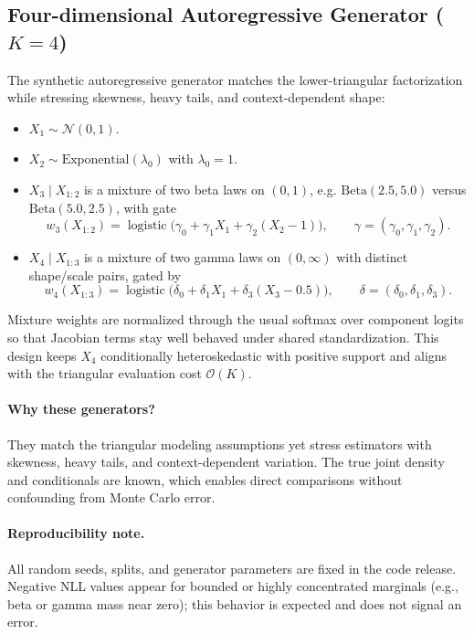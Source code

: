 \documentclass[11pt,a4paper,twoside]{book}\usepackage[]{graphicx}\usepackage[]{xcolor}
\begin{document}
\subsection{Four-dimensional Autoregressive Generator ($K=4$)}
The synthetic autoregressive generator matches the lower-triangular factorization while stressing skewness, heavy tails, and context-dependent shape:
\begin{itemize}
  \item $X_1 \sim \mathcal{N}(0,1)$.
  \item $X_2 \sim \mathrm{Exponential}(\lambda_0)$ with $\lambda_0 = 1$.
  \item $X_3 \mid X_{1:2}$ is a mixture of two beta laws on $(0,1)$, e.g. $\mathrm{Beta}(2.5, 5.0)$ versus $\mathrm{Beta}(5.0, 2.5)$, with gate
  \[ 
    w_3(X_{1:2}) = \operatorname{logistic}\big(\gamma_0 + \gamma_1 X_1 + \gamma_2 (X_2 - 1)\big), \qquad \gamma = (\gamma_0, \gamma_1, \gamma_2).
  \]
  \item $X_4 \mid X_{1:3}$ is a mixture of two gamma laws on $(0, \infty)$ with distinct shape/scale pairs, gated by
  \[ 
    w_4(X_{1:3}) = \operatorname{logistic}\big(\delta_0 + \delta_1 X_1 + \delta_3 (X_3 - 0.5)\big), \qquad \delta = (\delta_0, \delta_1, \delta_3).
  \]
\end{itemize}
Mixture weights are normalized through the usual softmax over component logits so that Jacobian terms stay well behaved under shared standardization. This design keeps $X_4$ conditionally heteroskedastic with positive support and aligns with the triangular evaluation cost $\mathcal{O}(K)$.

\paragraph{Why these generators?}
They match the triangular modeling assumptions yet stress estimators with skewness, heavy tails, and context-dependent variation. The true joint density and conditionals are known, which enables direct comparisons without confounding from Monte Carlo error.

\paragraph{Reproducibility note.}
All random seeds, splits, and generator parameters are fixed in the code release. Negative NLL values appear for bounded or highly concentrated marginals (e.g., beta or gamma mass near zero); this behavior is expected and does not signal an error.
\end{document}
